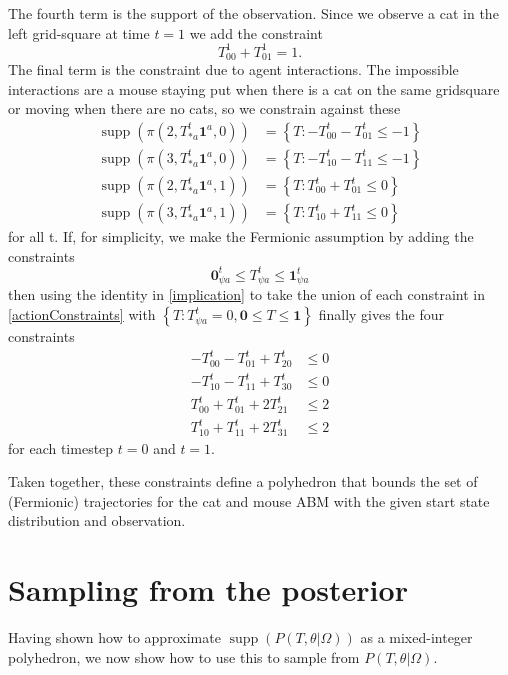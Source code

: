 \documentclass{article}
\DeclareMathOperator\supp{supp}
\begin{document}
The fourth term is the support of the observation. Since we observe a cat in the left grid-square at time $t=1$ we add the constraint
\[
T^1_{0 0} + T^1_{0 1} = 1.
\]
The final term is the constraint due to agent interactions. The impossible interactions are a mouse staying put when there is a cat on the same gridsquare or moving when there are no cats, so we constrain against these
\begin{equation}
\begin{aligned}
\supp(\pi(2,T^t_{* a}\mathbf{1}^a,0)) &= \left\{ T: -T^t_{0 0} - T^t_{0 1} \le -1 \right\}\\
\supp(\pi(3,T^t_{* a}\mathbf{1}^a,0)) &= \left\{ T: -T^t_{1 0} - T^t_{1 1} \le -1 \right\}\\
\supp(\pi(2,T^t_{* a}\mathbf{1}^a,1)) &= \left\{ T: T^t_{0 0} + T^t_{0 1} \le 0 \right\}\\
\supp(\pi(3,T^t_{* a}\mathbf{1}^a,1)) &= \left\{ T: T^t_{1 0} + T^t_{1 1} \le 0 \right\}
\end{aligned}
\label{actionConstraints}
\end{equation}
for all t. If, for simplicity, we make the Fermionic assumption by adding the constraints
\[
\mathbf{0}^t_{\psi a} \le T^t_{\psi a} \le \mathbf{1}^t_{\psi a}
\]
then using the identity in \eqref{implication} to take the union of each constraint in \eqref{actionConstraints} with $\left\{T: T^t_{\psi a} = 0, \mathbf{0} \le T \le \mathbf{1}\right\}$ finally gives the four constraints
\[
\begin{aligned}
-T^t_{0 0} - T^t_{0 1} + T^t_{2 0} & \le 0\\
-T^t_{1 0} - T^t_{1 1} + T^t_{3 0} & \le 0\\
T^t_{0 0} + T^t_{0 1} + 2T^t_{2 1} & \le 2 \\
T^t_{1 0} + T^t_{1 1} + 2T^t_{3 1} & \le 2
\end{aligned}
\]
for each timestep $t=0$ and $t=1$.

Taken together, these constraints define a polyhedron that bounds the set of (Fermionic) trajectories for the cat and mouse ABM with the given start state distribution and observation.

\section{Sampling from the posterior}

Having shown how to approximate $\supp(P(T,\theta|\Omega))$ as a mixed-integer polyhedron, we now show how to use this to sample from $P(T,\theta|\Omega)$.
\end{document}
